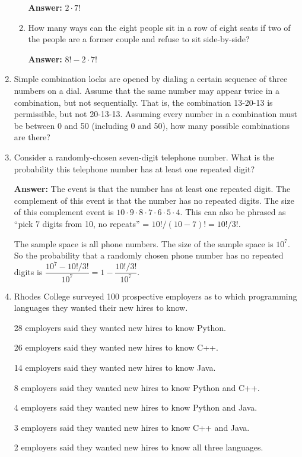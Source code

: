 \documentclass[11pt, letterpaper]{report}
\begin{document}
\begin{enumerate}
\begin{enumerate}
\textbf{Answer:} $2 \cdot 7!$

\item How many ways can the eight people sit in a row of eight seats if two of the people
are a former couple and refuse to sit side-by-side?

\textbf{Answer:} $8! - 2 \cdot 7!$
\end{enumerate}


\item Simple combination locks are opened by dialing a certain sequence of three numbers on a dial.  Assume that the same number may appear twice in a combination, but not sequentially.
That is, the combination 13-20-13 is permissible, but not 20-13-13.  Assuming every number
in a combination must be between 0 and 50 (including 0 and 50), how many possible combinations are there?

\item Consider a randomly-chosen seven-digit telephone number.  What is the probability this telephone number has at least one repeated digit?

\textbf{Answer:} The event is that the number has at least one repeated digit.  The complement of this event is that the number has no repeated
digits.  The size of this complement event is $10\cdot 9 \cdot 8 \cdot 7 \cdot 6 \cdot 5 \cdot 4$.  This can also be phrased as ``pick 7 digits from 10, no 
repeats'' = $10!/(10-7)! = 10!/3!$.

The sample space is all phone numbers.  The size of the sample space is $10^7$.  So the probability that a randomly chosen phone number has no repeated digits 
is $\dfrac{10^7 - 10!/3!}{10^7} = 1 - \dfrac{10!/3!}{10^7}$.


\item Rhodes College surveyed 100 prospective employers as to which programming languages
they wanted their new hires to know.  

28 employers said they wanted new hires to know Python.

26 employers said they wanted new hires to know C++.  

14 employers said they wanted new hires to know Java.

8 employers said they wanted new hires to know Python and C++.

4 employers said they wanted new hires to know Python and Java.

3 employers said they wanted new hires to know C++ and Java.

2 employers said they wanted new hires to know all three languages.


\end{enumerate}
\end{document}
